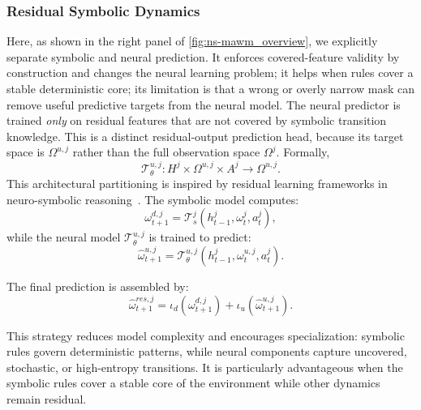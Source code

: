 \documentclass{article}
\theoremstyle{plain}
\theoremstyle{definition}
\theoremstyle{remark}
\begin{document}
\subsubsection{Residual Symbolic Dynamics}
\label{sec:residual_symbolic_dynamics}

Here, as shown in the right panel of \autoref{fig:ns-mawm_overview}, we explicitly separate symbolic and neural prediction. It enforces covered-feature validity by construction and changes the neural learning problem; it helps when rules cover a stable deterministic core; its limitation is that a wrong or overly narrow mask can remove useful predictive targets from the neural model. The neural predictor is trained \emph{only} on residual features that are not covered by symbolic transition knowledge. This is a distinct residual-output prediction head, because its target space is $\Omega^{u,j}$ rather than the full observation space $\Omega^j$. Formally,
\begin{equation}
  \mathcal{T}^{u,j}_{\theta}: H^j \times \Omega^{u,j} \times A^j \rightarrow \Omega^{u,j}.
  \label{eq:residual_predictor_type}
\end{equation}
This architectural partitioning is inspired by residual learning frameworks in neuro-symbolic reasoning~\cite{garcez2023neurosymbolic, balloch2023neurosymbolicworldmodelsadapting}. The symbolic model computes:
\begin{equation}
  \omega^{d,j}_{t+1} = \mathcal{T}^j_s(h^j_{t-1}, \omega^j_t, a^j_t),
\end{equation}
while the neural model $\mathcal{T}_{\theta}^{u,j}$ is trained to predict:
\begin{equation}
  \hat{\omega}^{u,j}_{t+1} = \mathcal{T}_{\theta}^{u,j}(h^j_{t-1}, \omega^{u,j}_t, a^j_t).
  \label{eq:residual_prediction}
\end{equation}

The final prediction is assembled by:
\begin{equation}
  \hat{\omega}^{res,j}_{t+1}
  =
  \iota_d(\omega^{d,j}_{t+1})
  +
  \iota_u(\hat{\omega}^{u,j}_{t+1}).
  \label{eq:residual_assembly}
\end{equation}

This strategy reduces model complexity and encourages specialization: symbolic rules govern deterministic patterns, while neural components capture uncovered, stochastic, or high-entropy transitions. It is particularly advantageous when the symbolic rules cover a stable core of the environment while other dynamics remain residual.
\end{document}
